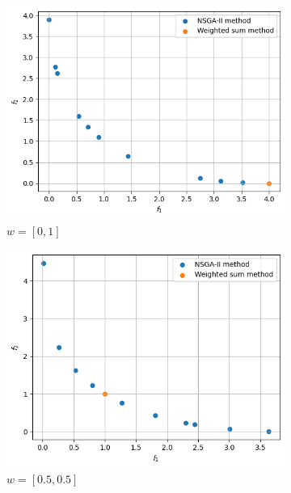 \begin{figure}[ht]
    \centering

    \begin{subfigure}{0.32\textwidth}
        \includegraphics[width=\textwidth]{images/p3-w00_10.png}
        \caption{\(w = [0, 1]\)}
    \end{subfigure}
    \hfill
    \begin{subfigure}{0.32\textwidth}
        \includegraphics[width=\textwidth]{images/p3-w05_05.png}
        \caption{\(w = [0.5, 0.5]\)}
    \end{subfigure}
    \hfill
    \begin{subfigure}{0.32\textwidth}

\end{subfigure}
\end{figure}
